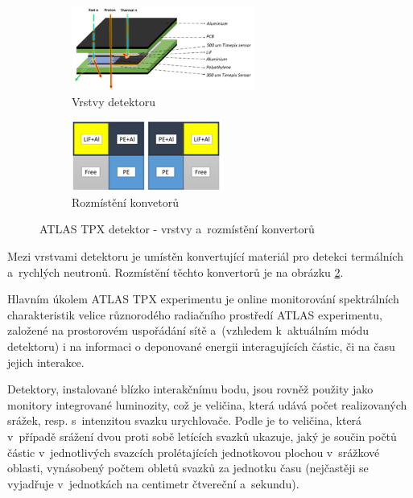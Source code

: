 \begin{figure}[th]
	\begin{center}
		\begin{subfigure}{6cm}
			\includegraphics[width=6cm]{figures/tpx_lay.png}	
			\caption{Vrstvy detektoru}
			\label{fig:tpx_detector_layers}
		\end{subfigure}
		\hspace{0.5cm}
		\begin{subfigure}{5cm}
			\includegraphics[width=5cm]{figures/tpx_conv.png}
			\caption{Rozmístění konvetorů}
			\label{fig:tpx_detector_convertors}
		\end{subfigure}
		\caption{ATLAS TPX detektor - vrstvy a~rozmístění konvertorů}
		\label{fig:tpx_detector}
	\end{center}			
\end{figure}

Mezi vrstvami detektoru je umístěn konvertující materiál pro detekci termálních a~rychlých neutronů. Rozmístění těchto konvertorů je na obrázku \ref{fig:tpx_detector_convertors}.

Hlavním úkolem ATLAS TPX experimentu je online monitorování spektrálních charakteristik velice různorodého radiačního prostředí ATLAS experimentu, založené na prostorovém uspořádání sítě a~(vzhledem k~aktuálním módu detektoru) i na informaci o deponované energii interagujících částic, či na času jejich interakce. 


Detektory, instalované blízko interakčnímu bodu, jsou rovněž použity jako monitory integrované luminozity, což je veličina, která udává počet realizovaných srážek, resp. s~intenzitou svazku urychlovače. Podle \cite{wagner:o_lhc} je to veličina, která v~případě srážení dvou proti sobě letících svazků ukazuje, jaký je součin počtů částic v~jednotlivých svazcích prolétajících jednotkovou plochou v~srážkové oblasti, vynásobený počtem obletů svazků za jednotku času (nejčastěji se vyjadřuje v~jednotkách na centimetr čtvereční a~sekundu).

